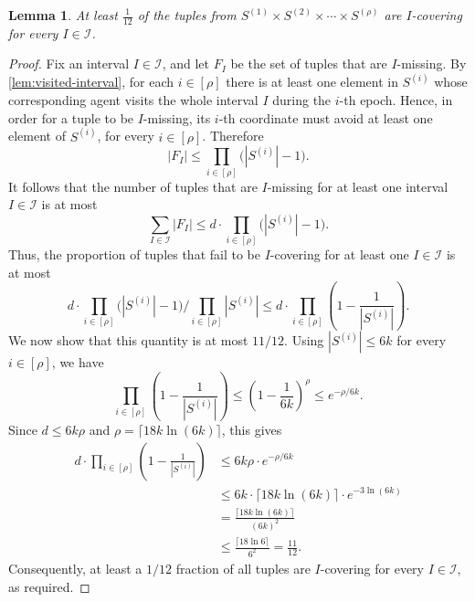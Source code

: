 \documentclass[10pt,a4paper]{amsart}
\newtheorem{lemma}{Lemma}
\newcommand{\bfI}{\ensuremath{\mathcal{I}}}
\begin{document}
\begin{lemma}\label{lem:I-covering}
   At least $\frac{1}{12}$ of the tuples from $S^{(1)} \times S^{(2)} \times \cdots \times S^{(\rho)}$ are $I$-covering for every $I \in \bfI$.
\end{lemma}

\begin{proof}
    Fix an interval $I \in \bfI$, and let $F_I$ be the set of tuples that are
    $I$-missing. By \cref{lem:visited-interval}, for each $i \in [\rho]$ there is
    at least one element in $S^{(i)}$ whose corresponding agent visits the whole
    interval $I$ during the $i$-th epoch. Hence, in order for a tuple to be
    $I$-missing, its $i$-th coordinate must avoid at least one element of
    $S^{(i)}$, for every $i \in [\rho]$. Therefore
    \[
        |F_I|
        \leq
        \prod_{i \in [\rho]} \bigl(|S^{(i)}|-1\bigr).
    \]
    It follows that the number of tuples that are $I$-missing
    for at least one interval $I \in \bfI$ is at most
    \[
        \sum_{I \in \bfI} |F_I|
        \leq
        d \cdot \prod_{i \in [\rho]} \bigl(|S^{(i)}|-1\bigr).
    \]
    Thus, the proportion of tuples that fail to be $I$-covering for at least one
    $I \in \bfI$ is at most
    \[
        d \cdot \prod_{i \in [\rho]} \bigl(|S^{(i)}|-1\bigr)
        \Big/
        \prod_{i \in [\rho]} |S^{(i)}|
    \leq
        d \cdot
        \prod_{i \in [\rho]}
        \left(1-\frac{1}{|S^{(i)}|}\right).
    \]
    We now show that this quantity is at most $11/12$. Using
    $|S^{(i)}| \leq 6k$ for every $i \in [\rho]$, we have
    \[
        \prod_{i \in [\rho]}
        \left(1-\frac{1}{|S^{(i)}|}\right)
        \leq
        \left(1-\frac{1}{6k}\right)^\rho
        \leq
        e^{-\rho/6k}.
    \]
    Since $d \leq 6k\rho$ and $\rho=\lceil 18k \ln(6k)\rceil$, this gives
    \begin{align*}
        d \cdot
        \prod_{i \in [\rho]}
        \left(1-\frac{1}{|S^{(i)}|}\right)
        &\leq
        6k\rho \cdot e^{-\rho/6k} \\
        &\leq
        6k \cdot \lceil 18k \ln(6k)\rceil
        \cdot e^{-3\ln(6k)} \\
        &=
        \frac{\lceil 18k \ln(6k)\rceil}{(6k)^2} \\
        &\leq
        \frac{\lceil 18\ln 6\rceil}{6^2}
        =
        \frac{11}{12}.
    \end{align*}
    Consequently, at least a $1/12$ fraction of all tuples are $I$-covering for every $I \in \bfI$, as required.
\end{proof}
\end{document}
